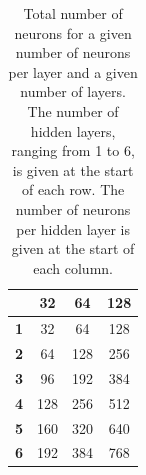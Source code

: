 \begin{table}
\centering
\begin{tabular}{|c|c|c|c|}
    \hline
     & \textbf{32} & \textbf{64} & \textbf{128} \\
    \hline
    \textbf{1}  & 32 & 64 & 128 \\
    \hline
    \textbf{2}  & 64 & 128 & 256 \\
    \hline
    \textbf{3}  & 96 & 192 & 384 \\
    \hline
    \textbf{4}  & 128 & 256 & 512 \\
    \hline
    \textbf{5}  & 160 & 320 & 640 \\
    \hline
    \textbf{6}  & 192 & 384 & 768 \\
    \hline
\end{tabular}
\caption{Total number of neurons for a given number of neurons per layer and a given number of layers. The number of hidden layers, ranging from 1 to 6, is given at the start of each row. The number of neurons per hidden layer is given at the start of each column.}
\label{table:total_neurons}
\end{table}

